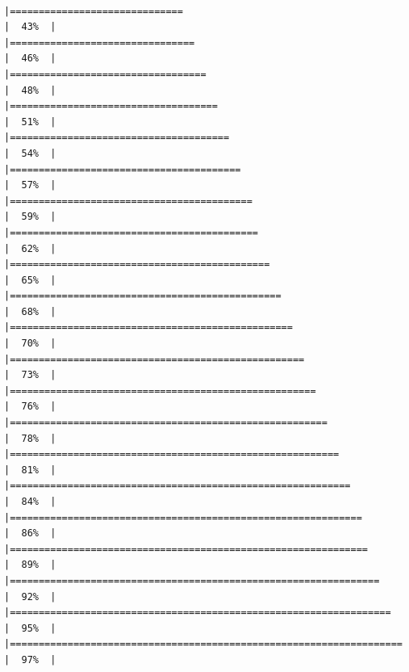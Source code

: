 \documentclass[
]{article}
\begin{document}
\begin{verbatim}
                                                                    |==============================                                        |  43%  |                                                                              |================================                                      |  46%  |                                                                              |==================================                                    |  48%  |                                                                              |====================================                                  |  51%  |                                                                              |======================================                                |  54%  |                                                                              |========================================                              |  57%  |                                                                              |==========================================                            |  59%  |                                                                              |===========================================                           |  62%  |                                                                              |=============================================                         |  65%  |                                                                              |===============================================                       |  68%  |                                                                              |=================================================                     |  70%  |                                                                              |===================================================                   |  73%  |                                                                              |=====================================================                 |  76%  |                                                                              |=======================================================               |  78%  |                                                                              |=========================================================             |  81%  |                                                                              |===========================================================           |  84%  |                                                                              |=============================================================         |  86%  |                                                                              |==============================================================        |  89%  |                                                                              |================================================================      |  92%  |                                                                              |==================================================================    |  95%  |                                                                              |====================================================================  |  97%  |           
\end{verbatim}
\end{document}
